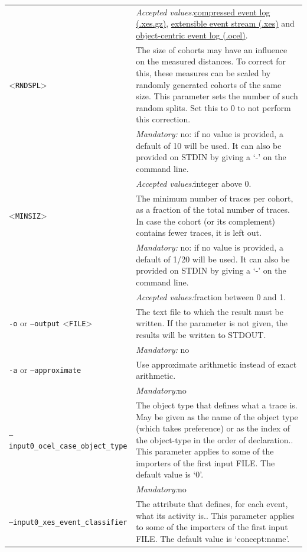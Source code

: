 {\begin{tabularx}{\linewidth}{lX}
&\textit{Accepted values:}\quad \hyperref[filehandler:compressed event log]{compressed event log (.xes.gz)}, \hyperref[filehandler:extensible event stream]{extensible event stream (.xes)} and \hyperref[filehandler:object-centric event log]{object-centric event log (.ocel)}.\\
<\texttt{RNDSPL}>&The size of cohorts may have an influence on the measured distances. To correct for this, these measures can be scaled by randomly generated cohorts of the same size. This parameter sets the number of such random splits. Set this to 0 to not perform this correction.\\
&\textit{Mandatory:} \quad no: if no value is provided, a default of 10 will be used. It can also be provided on STDIN by giving a `-' on the command line.\\
&\textit{Accepted values:}\quad integer above 0.\\
<\texttt{MINSIZ}>&The minimum number of traces per cohort, as a fraction of the total number of traces. In case the cohort (or its complement) contains fewer traces, it is left out.\\
&\textit{Mandatory:} \quad no: if no value is provided, a default of 1/20 will be used. It can also be provided on STDIN by giving a `-' on the command line.\\
&\textit{Accepted values:}\quad fraction between 0 and 1.\\
\texttt{-o} or \texttt{--output} <\texttt{FILE}> &
The text file to which the result must be written. If the parameter is not given, the results will be written to STDOUT.\\
&\textit{Mandatory:} \quad no\\
\texttt{-a} or \texttt{--approximate} & Use approximate arithmetic instead of exact arithmetic.\\
&\textit{Mandatory:}\quad no\\
\texttt{--input0\_ocel\_case\_object\_type} & The object type that defines what a trace is. May be given as the name of the object type (which takes preference) or as the index of the object-type in the order of declaration.. This parameter applies to some of the importers of the first input FILE. The default value is `0'.\\
&\textit{Mandatory:}\quad no\\
\texttt{--input0\_xes\_event\_classifier} & The attribute that defines, for each event, what its activity is.. This parameter applies to some of the importers of the first input FILE. The default value is `concept:name'.\\

\end{tabularx}}
